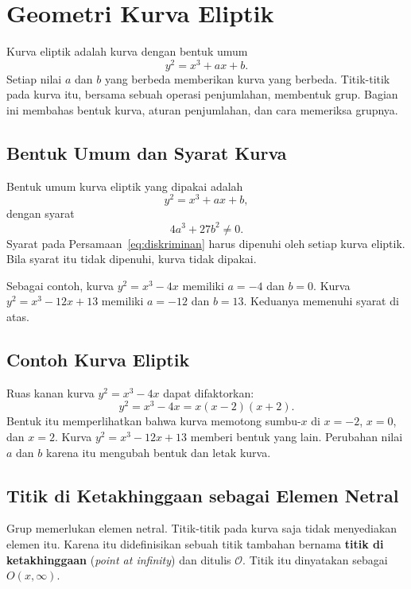 \section{Geometri Kurva Eliptik}
\label{sec:geometri-ec}

Kurva eliptik adalah kurva dengan bentuk umum
\[
y^2 = x^3 + ax + b .
\]
Setiap nilai $a$ dan $b$ yang berbeda memberikan kurva yang berbeda. Titik-titik
pada kurva itu, bersama sebuah operasi penjumlahan, membentuk grup. Bagian ini
membahas bentuk kurva, aturan penjumlahan, dan cara memeriksa grupnya.

\subsection{Bentuk Umum dan Syarat Kurva}
\label{subsec:weierstrass}

Bentuk umum kurva eliptik yang dipakai adalah
\begin{equation}
y^2 = x^3 + ax + b ,
\label{eq:weierstrass}
\end{equation}
dengan syarat
\begin{equation}
4a^3 + 27b^2 \neq 0 .
\label{eq:diskriminan}
\end{equation}
Syarat pada Persamaan~\eqref{eq:diskriminan} harus dipenuhi oleh setiap kurva
eliptik. Bila syarat itu tidak dipenuhi, kurva tidak dipakai.

Sebagai contoh, kurva $y^2 = x^3 - 4x$ memiliki $a = -4$ dan $b = 0$. Kurva
$y^2 = x^3 - 12x + 13$ memiliki $a = -12$ dan $b = 13$. Keduanya memenuhi
syarat di atas.

\subsection{Contoh Kurva Eliptik}
\label{subsec:galeri-kurva}

Ruas kanan kurva $y^2 = x^3 - 4x$ dapat difaktorkan:
\[
y^2 = x^3 - 4x = x(x - 2)(x + 2) .
\]
Bentuk itu memperlihatkan bahwa kurva memotong sumbu-$x$ di $x = -2$, $x = 0$,
dan $x = 2$. Kurva $y^2 = x^3 - 12x + 13$ memberi bentuk yang lain. Perubahan
nilai $a$ dan $b$ karena itu mengubah bentuk dan letak kurva.

\subsection{Titik di Ketakhinggaan sebagai Elemen Netral}
\label{subsec:titik-ketakhinggaan}

Grup memerlukan elemen netral. Titik-titik pada kurva saja tidak menyediakan
elemen itu. Karena itu didefinisikan sebuah titik tambahan bernama
\textbf{titik di ketakhinggaan} (\textit{point at infinity}) dan ditulis
$\mathcal{O}$. Titik itu
dinyatakan sebagai $O(x, \infty)$.

